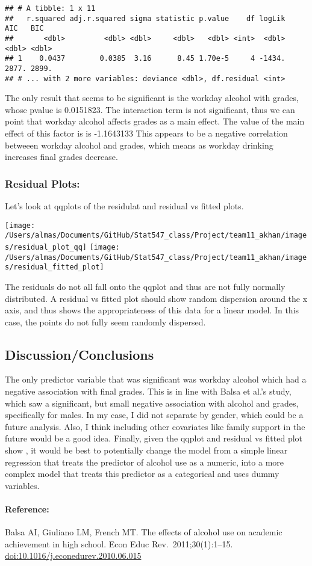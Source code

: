 \documentclass[]{article}
\let\oldparagraph\paragraph
\renewcommand{\paragraph}[1]{\oldparagraph{#1}\mbox{}}
\begin{document}
\begin{verbatim}
## # A tibble: 1 x 11
##   r.squared adj.r.squared sigma statistic p.value    df logLik   AIC   BIC
##       <dbl>         <dbl> <dbl>     <dbl>   <dbl> <int>  <dbl> <dbl> <dbl>
## 1    0.0437        0.0385  3.16      8.45 1.70e-5     4 -1434. 2877. 2899.
## # ... with 2 more variables: deviance <dbl>, df.residual <int>
\end{verbatim}

The only result that seems to be significant is the workday alcohol with
grades, whose pvalue is 0.0151823. The interaction term is not
significant, thus we can point that workday alcohol affects grades as a
main effect. The value of the main effect of this factor is is
-1.1643133 This appears to be a negative correlation betweeen workday
alcohol and grades, which means as workday drinking increases final
grades decrease.

\hypertarget{residual-plots}{%
\subsubsection{Residual Plots:}\label{residual-plots}}

Let's look at qqplots of the residulat and residual vs fitted plots.

\texttt{[image: /Users/almas/Documents/GitHub/Stat547\_class/Project/team11\_akhan/images/residual\_plot\_qq]}
\texttt{[image: /Users/almas/Documents/GitHub/Stat547\_class/Project/team11\_akhan/images/residual\_fitted\_plot]}

The residuals do not all fall onto the qqplot and thus are not fully
normally distributed. A residual vs fitted plot should show random
dispersion around the x axis, and thus shows the appropriateness of this
data for a linear model. In this case, the points do not fully seem
randomly dispersed.

\hypertarget{discussionconclusions}{%
\subsection{Discussion/Conclusions}\label{discussionconclusions}}

The only predictor variable that was significant was workday alcohol
which had a negative association with final grades. This is in line with
Balsa et al.'s study, which saw a significant, but small negative
association with alcohol and grades, specifically for males. In my case,
I did not separate by gender, which could be a future analysis. Also, I
think including other covariates like family support in the future would
be a good idea. Finally, given the qqplot and residual vs fitted plot
show , it would be best to potentially change the model from a simple
linear regression that treats the predictor of alcohol use as a numeric,
into a more complex model that treats this predictor as a categorical
and uses dummy variables.

\hypertarget{reference}{%
\paragraph{Reference:}\label{reference}}

Balsa AI, Giuliano LM, French MT. The effects of alcohol use on academic
achievement in high school. Econ Educ Rev.~2011;30(1):1--15.
\url{doi:10.1016/j.econedurev.2010.06.015}
\end{document}
